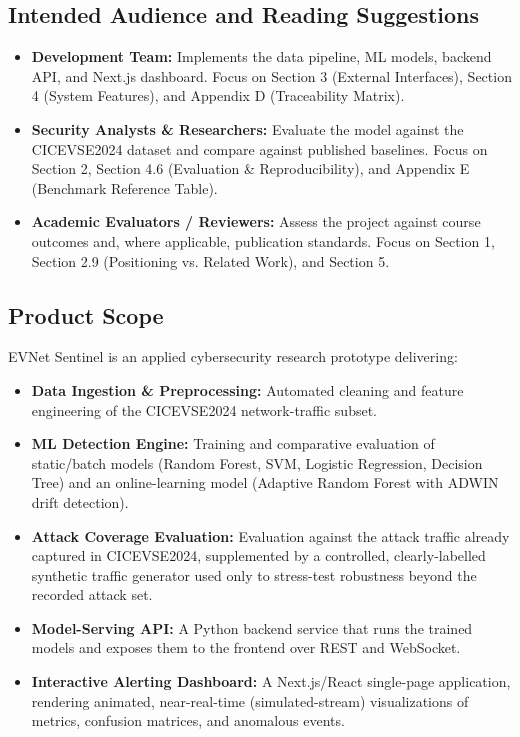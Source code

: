 \documentclass[11pt, a4paper]{article}
\begin{document}
\subsection{Intended Audience and Reading Suggestions}
\begin{itemize}
    \item \textbf{Development Team:} Implements the data pipeline, ML models, backend API, and Next.js dashboard. Focus on Section 3 (External Interfaces), Section 4 (System Features), and Appendix D (Traceability Matrix).
    \item \textbf{Security Analysts \& Researchers:} Evaluate the model against the CICEVSE2024 dataset and compare against published baselines. Focus on Section 2, Section 4.6 (Evaluation \& Reproducibility), and Appendix E (Benchmark Reference Table).
    \item \textbf{Academic Evaluators / Reviewers:} Assess the project against course outcomes and, where applicable, publication standards. Focus on Section 1, Section 2.9 (Positioning vs. Related Work), and Section 5.
\end{itemize}

\subsection{Product Scope}
EVNet Sentinel is an applied cybersecurity research prototype delivering:
\begin{itemize}
    \item \textbf{Data Ingestion \& Preprocessing:} Automated cleaning and feature engineering of the CICEVSE2024 network-traffic subset.
    \item \textbf{ML Detection Engine:} Training and comparative evaluation of static/batch models (Random Forest, SVM, Logistic Regression, Decision Tree) and an online-learning model (Adaptive Random Forest with ADWIN drift detection).
    \item \textbf{Attack Coverage Evaluation:} Evaluation against the attack traffic already captured in CICEVSE2024, supplemented by a controlled, clearly-labelled synthetic traffic generator used only to stress-test robustness beyond the recorded attack set.
    \item \textbf{Model-Serving API:} A Python backend service that runs the trained models and exposes them to the frontend over REST and WebSocket.
    \item \textbf{Interactive Alerting Dashboard:} A Next.js/React single-page application, rendering animated, near-real-time (simulated-stream) visualizations of metrics, confusion matrices, and anomalous events.
\end{itemize}
\end{document}
